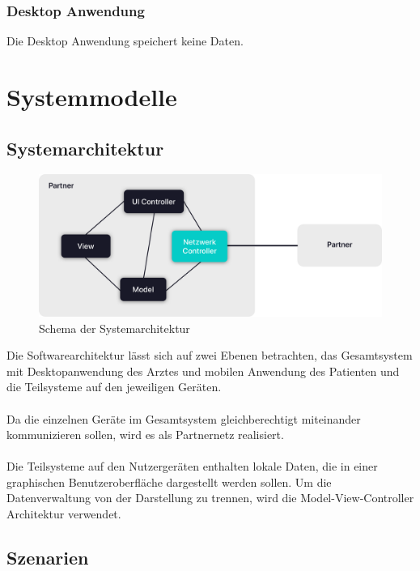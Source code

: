 \documentclass[a4paper]{scrreprt}
\begin{document}
\subsection{\gls{Desktop Anwendung}}
Die \gls{Desktop Anwendung} speichert keine Daten.


\chapter{Systemmodelle}
\section{Systemarchitektur}
\begin{figure}[ht]
  \centering
  \includegraphics[width=1\textwidth]{Systemarchitektur}
  \caption{Schema der Systemarchitektur}
\end{figure}
Die Softwarearchitektur lässt sich auf zwei Ebenen betrachten, das Gesamtsystem mit Desktopanwendung des Arztes und mobilen Anwendung des Patienten und die Teilsysteme auf den jeweiligen Geräten. \\\\
Da die einzelnen Geräte im Gesamtsystem gleichberechtigt miteinander kommunizieren sollen, wird es als Partnernetz realisiert.\\\\
Die Teilsysteme auf den Nutzergeräten enthalten lokale Daten, die in einer graphischen Benutzeroberfläche dargestellt werden sollen. Um die Datenverwaltung von der Darstellung zu trennen, wird die Model-View-Controller Architektur verwendet.

\section{Szenarien}
\end{document}
